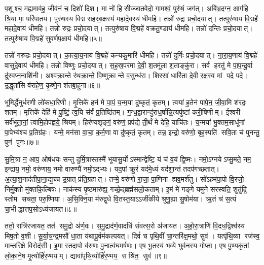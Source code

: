 प॒शूश्च॒ मह्य॒माव॑ह॒ जीव॑नं च॒ दिशो॑ दिश। मा नो॑ हिसीज्जातवेदो॒ गामश्वं॒ पुरु॑षं॒ जग॑त्। अबि॑भ्र॒दग्न॒ आग॑हि श्रि॒या मा॒ परि॑पातय। पुरु॑षस्य विद्म सहस्रा॒क्षस्य॑ महादे॒वस्य॑ धीमहि। तन्नो॑ रुद्रः प्रचो॒दयात्। तत्पुरु॑षाय वि॒द्महे॑ महादे॒वाय॑ धीमहि। तन्नो॑ रुद्रः प्रचो॒दयात्। तत्पुरु॑षाय वि॒द्महे॑ वक्रतु॒ण्डाय॑ धीमहि। तन्नो॑ दन्तिः प्रचो॒दयात्। तत्पुरु॑षाय वि॒द्महे॑ सुवर्णप॒क्षाय॑ धीमहि॥५॥

तन्नो॑ गरुडः प्रचो॒दयात्। का॒त्या॒य॒नाय॑ वि॒द्महे॑ कन्यकु॒मारि॑ धीमहि। तन्नो॑ दुर्गिः प्रचो॒दयात्। ना॒रा॒य॒णाय॑ वि॒द्महे॑ वासुदे॒वाय॑ धीमहि। तन्नो॑ विष्णुः प्रचो॒दयात्। स॒ह॒स्र॒पर॑मा दे॒वी॒ श॒तमू॑ला श॒ताङ्कु॑रा। सर्व हरतु॑ मे पा॒प॒न्दू॒र्वा दु॑स्वप्न॒नाशि॑नी। अश्व॑क्रा॒न्ते र॑थक्रा॒न्ते॒ वि॒ष्णुक्रान्ते व॒सुन्ध॑रा। शिरसा॑ धारि॑ता दे॒वी॒ र॒क्ष॒स्व मां पदे॒ पदे। उ॒द्धृता॑सि व॑राहे॒ण॒ कृ॒ष्णे॒न श॑तबा॒हुना॥६॥

भूमिर्द्धेनुर्धरणी लो॑कधा॒रिणी। मृ॒त्तिके॑ हन॑ मे पा॒पं॒ य॒न्म॒या दु॑ष्कृतं॒ कृतम्। त्वया॑ ह॒तेन॑ पापे॒न॒ जी॒वा॒मि श॑रदः॒ शतम्। मृ॒त्तिके॑ देहि॑ मे पु॒ष्टिं॒ त्व॒यि स॑र्वं प्र॒तिष्ठि॑तम्। ग॒न्ध॒द्वा॒रान्दु॑राध॒र्\mbox{}षान्नि॒त्यपु॑ष्टां करी॒षिणीम्। ई॒श्वरी सर्व॑भूता॒नां॒ त्वामि॒होप॑ह्वये॒ श्रियम्। हिर॑ण्यशृङ्गं॒ वरु॑णं॒ प्रप॑द्ये ती॒र्थं मे देहि॒ याचि॑तः। य॒न्मया॑ भु॒क्तम॒साधू॑नां पा॒पेभ्य॑श्च प्र॒तिग्र॑हः। यन्मे॒ मन॑सा वा॒चा॒ क॒र्म॒णा वा दु॑ष्कृतं॒ कृतम्। तन्न॒ इन्द्रो॒ वरु॑णो॒ बृह॒स्पति॑ सवि॒ता च॑ पुनन्तु॒ पुन॑ पुनः॥७॥

सु॒मि॒त्रा न॒ आप॒ ओष॑धयः सन्तु दुर्मि॒त्रास्तस्मै॑ भूयासु॒र्योऽस्मान्द्वेष्टि॒ यं च॑ व॒यं द्वि॒ष्मः। नमो॒ऽग्नयेऽप्सु॒मते॒ नम॒ इन्द्रा॑य॒ नमो॒ वरु॑णाय॒ नमो वारुण्यै॑ नमो॒ऽद्भ्यः। यद॒पां क्रू॒रं यद॑मे॒ध्यं यद॑शा॒न्तं तदप॑गच्छतात्। अ॒त्या॒श॒नाद॑तीपा॒ना॒द्य॒च्च उ॒ग्रात् प्र॑ति॒ग्रहात्। तन्मे॒ वरु॑णो रा॒जा॒ पा॒णिना ह्यव॒मर्\mbox{}श॑तु। सो॑ऽहम॑पा॒पो वि॒रजो॒ निर्मु॒क्तो मु॑क्तकि॒ल्बिषः। नाक॑स्य पृ॒ष्ठमारु॑ह्य॒ गच्छे॒द्ब्रह्म॑सलो॒कताम्। इ॒मं मे॑ गङ्गे यमुने सरस्वति॒ शुतु॑द्रि॒ स्तोम सचता॒ परु॒ष्णिया। अ॒सि॒क्नि॒या म॑रुद्वृधे वि॒तस्त॒याऽऽर्जी॑कीये श्रुणु॒ह्या सु॒षोम॑या। ऋ॒तं च॑ स॒त्यं चा॒भीद्धा॒त्तप॒सोऽध्य॑जायत॥८॥

ततो॒ रात्रि॑रजायत॒ तत॑ समु॒द्रो अ॑र्ण॒वः। स॒मु॒द्राद॑र्ण॒वादधि॑ संवत्स॒रो अ॑जायत। अ॒हो॒रा॒त्राणि॑ वि॒दध॒द्विश्व॑स्य मिष॒तो व॒शी। सू॒र्या॒च॒न्द्र॒मसौ॑ धा॒ता य॑थापू॒र्वम॑कल्पयत्। दिवं॑ च पृथि॒वीं चा॒न्तरि॑क्ष॒मथो॒ सुव॑। यत्पृ॑थि॒व्या रज॑स्व॒ मान्तरि॑क्षे वि॒रोद॑सी। इ॒मास्तदा॒पो व॑रुणः पु॒नात्व॑घमर्\mbox{}ष॒णः। ए॒ष भू॒तस्य॑ भ॒व्ये भुव॑नस्य गो॒प्ता। ए॒ष पु॒ण्यकृ॑तां लो॒का॒ने॒ष मृ॒त्योर्\mbox{}हि॑र॒ण्मयम्। द्यावा॑पृथि॒व्योर्\mbox{}हि॑र॒ण्मय॒ सश्रि॑त॒ सुव॑॥९॥

